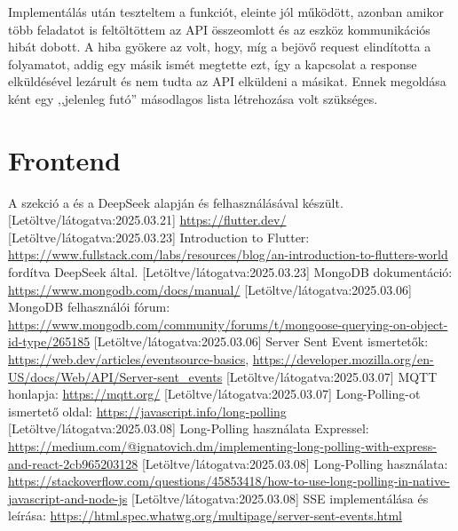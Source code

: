\documentclass{thesis-ekf}
\theoremstyle{definition}
\theoremstyle{remark}
\begin{document}
	Implementálás után teszteltem a funkciót, eleinte jól működött, azonban amikor több feladatot is feltöltöttem az API összeomlott és az eszköz kommunikációs hibát dobott. A hiba gyökere az volt, hogy, míg a bejövő request elindította a folyamatot, addig egy másik ismét megtette ezt, így a kapcsolat a response elküldésével lezárult és nem tudta az API elküldeni a másikat. Ennek megoldása ként egy ,,jelenleg futó'' másodlagos lista létrehozása volt szükséges.
	
	\chapter{Frontend}
\begin{thebibliography}{8}
	A szekció a \href{https://blockchainsimplified.com/blog/mongodb-introduction/}{\color{blue}{Blockchain Simplified}} és a DeepSeek alapján és felhasználásával készült.
	[Letöltve/látogatva:2025.03.21]
	\url{https://flutter.dev/}
	[Letöltve/látogatva:2025.03.23]
	Introduction to Flutter: \url{https://www.fullstack.com/labs/resources/blog/an-introduction-to-flutters-world} fordítva DeepSeek által.
	[Letöltve/látogatva:2025.03.23]
	MongoDB dokumentáció: \url{https://www.mongodb.com/docs/manual/} [Letöltve/látogatva:2025.03.06]
	MongoDB felhasználói fórum: \url{https://www.mongodb.com/community/forums/t/mongoose-querying-on-object-id-type/265185}
	[Letöltve/látogatva:2025.03.06]
	Server Sent Event ismertetők: \url{https://web.dev/articles/eventsource-basics}, \url{https://developer.mozilla.org/en-US/docs/Web/API/Server-sent_events}
	[Letöltve/látogatva:2025.03.07]
	 MQTT honlapja: \url{https://mqtt.org/}
	[Letöltve/látogatva:2025.03.07]
	 Long-Polling-ot ismertető oldal: \url{https://javascript.info/long-polling}
	[Letöltve/látogatva:2025.03.08]
	 Long-Polling használata Expressel: \url{https://medium.com/@ignatovich.dm/implementing-long-polling-with-express-and-react-2cb965203128}
	[Letöltve/látogatva:2025.03.08]
	 Long-Polling használata: \url{https://stackoverflow.com/questions/45853418/how-to-use-long-polling-in-native-javascript-and-node-js}
	[Letöltve/látogatva:2025.03.08]
	 SSE implementálása és leírása: \url{https://html.spec.whatwg.org/multipage/server-sent-events.html}

\end{thebibliography}
\end{document}
